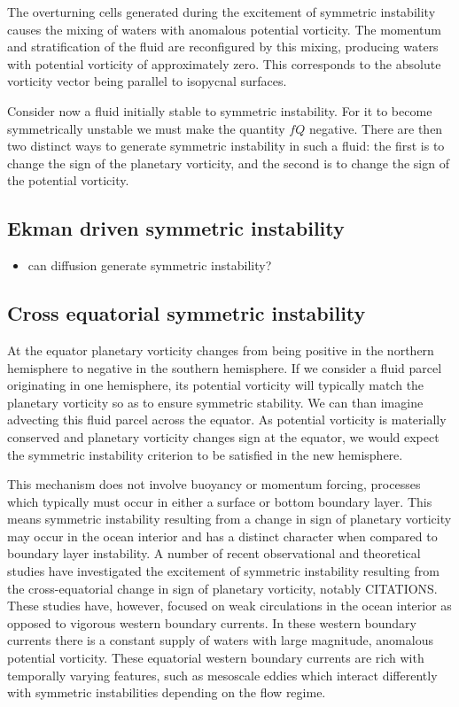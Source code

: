 The overturning cells generated during the excitement of symmetric instability causes the mixing of waters with anomalous potential vorticity. The momentum and stratification of the fluid are reconfigured by this mixing, producing waters with potential  vorticity of approximately zero. This corresponds to the absolute vorticity vector being parallel to isopycnal surfaces.

Consider now a fluid initially stable to symmetric instability. For it to become symmetrically unstable we must make the quantity $fQ$ negative. There are then two distinct ways to generate symmetric instability in such a fluid: the first is to change the sign of the planetary vorticity, and the second is to change the sign of the potential vorticity.

\subsection{Ekman driven symmetric instability}
\begin{itemize}
    \item can diffusion generate symmetric instability?
\end{itemize}

\subsection{Cross equatorial symmetric instability}
At the equator planetary vorticity changes from being positive in the northern hemisphere to negative in the southern hemisphere. If we consider a fluid parcel originating in one hemisphere, its potential vorticity will typically match the planetary vorticity so as to ensure symmetric stability. We can than imagine advecting this fluid parcel across the equator. As potential vorticity is materially conserved and planetary vorticity changes sign at the equator, we would expect the symmetric instability criterion to be satisfied in the new hemisphere.

This mechanism does not involve buoyancy or momentum forcing, processes which typically must occur in either a surface or bottom boundary layer. This means symmetric instability resulting from a change in sign of planetary vorticity may occur in the ocean interior and has a distinct character when compared to boundary layer instability. A number of recent observational and theoretical studies have investigated the excitement of symmetric instability resulting from the cross-equatorial change in sign of planetary vorticity, notably CITATIONS. These studies have, however, focused on weak circulations in the ocean interior as opposed to vigorous western boundary currents. In these western boundary currents there is a constant supply of waters with large magnitude, anomalous potential vorticity. These equatorial western boundary currents are rich with temporally varying features, such as mesoscale eddies which interact differently with symmetric instabilities depending on the flow regime.

